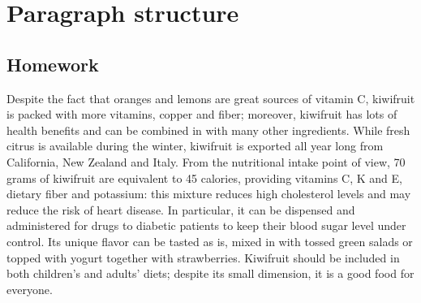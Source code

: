 
\chapter{Paragraph structure}

\section{Homework}

Despite the fact that oranges and lemons are great sources of vitamin C,
kiwifruit is packed with more vitamins, copper and fiber;
moreover, kiwifruit has lots of health benefits and can be combined in with
many other ingredients. While fresh citrus is available during
the winter, kiwifruit is exported all year long from California, New Zealand and
Italy. From the nutritional intake point of view,
70 grams of kiwifruit are equivalent to 45 calories,
providing vitamins C, K and E, dietary fiber and potassium: this
mixture reduces high cholesterol levels and may reduce the risk of
heart disease. In particular, it can be dispensed and administered
for drugs to diabetic
patients to keep their blood sugar level under control. Its
unique flavor can be tasted as is, mixed in with tossed green salads
or topped with yogurt together with strawberries.  Kiwifruit
should be included in both children's and adults' diets;
despite its small dimension, it is a good food for everyone.
